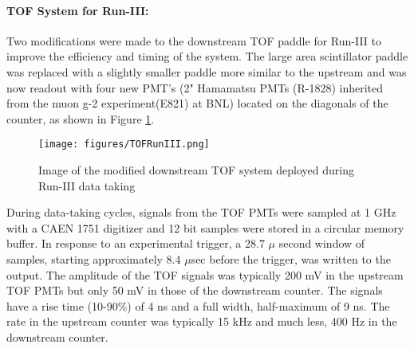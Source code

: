 \paragraph{\textbf{TOF System for Run-III:}}
Two modifications were made to the downstream TOF paddle for Run-III to improve the efficiency and timing of the system. The large area scintillator paddle was replaced with a slightly smaller paddle more similar to the upstream and was now readout with four new PMT's (2" Hamamatsu PMTs (R-1828) inherited from the muon g-2 experiment(E821) at BNL) located on the diagonals of the counter, as shown in Figure \ref{fig:TOFSystemRunIII}.

\begin{figure}[!h]
\begin{centering}
\vspace{-0.3cm}
\texttt{[image: figures/TOFRunIII.png]}
\caption{
{\scriptsize \sf Image of the modified downstream TOF system deployed during Run-III data taking }
}
\label{fig:TOFSystemRunIII}
\end{centering}
\end{figure}



During data-taking cycles, signals from the TOF PMTs were sampled at 1 GHz
with a CAEN 1751 digitizer and 12 bit samples were stored in a circular memory buffer. In response to an experimental trigger, a 28.7 $\mu$ second window of samples, starting approximately 8.4 $\mu$sec before the trigger, was written to the
output. The amplitude of the TOF signals was typically 200 mV in the upstream TOF PMTs but only 50 mV in those of the downstream counter. The signals have a rise time (10-90\%) of 4 ns and a full width, half-maximum of 9 ns. The rate in the upstream counter was typically 15 kHz and much less, 400 Hz in the downstream counter.

